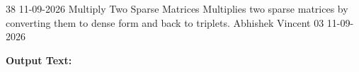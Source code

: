 \clearpage
\label{prog:38}
\programhead
  {38}
  {11-09-2026}
  {Multiply Two Sparse Matrices}
  {Multiplies two sparse matrices by converting them to dense form and back to triplets.}
  {Abhishek Vincent}
  {03}
  {11-09-2026}

\divider
\textbf{Output Text:}\par
\vspace{2pt}

